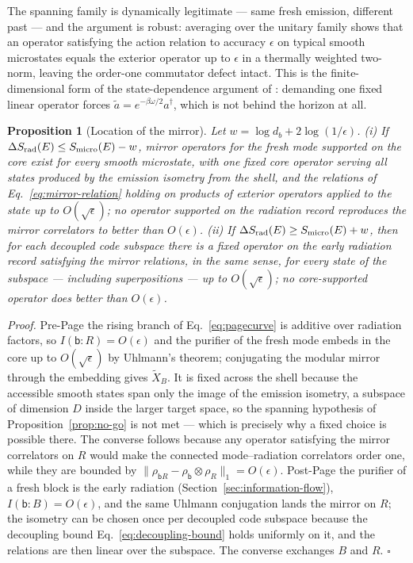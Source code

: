 \documentclass[12pt]{article}
\newcommand{\Smicro}{S_{\rm micro}}
\newtheorem{proposition}{Proposition}
\begin{document}
The spanning family is dynamically legitimate --- same fresh emission,
different past --- and the argument is robust: averaging over the unitary
family shows that an operator satisfying the action relation to accuracy
$\epsilon$ on typical smooth microstates equals the exterior operator up to
$\epsilon$ in a thermally weighted two-norm, leaving the order-one
commutator defect intact.  This is the finite-dimensional form of the
state-dependence argument of \cite{PapadodimasRaju2013,PapadodimasRaju2014}:
demanding one fixed linear operator forces $\tilde a=e^{-\beta\omega/2}
a^\dagger$, which is not behind the horizon at all.

\begin{proposition}[Location of the mirror]
\label{prop:mirror-location}
Let $w=\log d_b+2\log(1/\epsilon)$.
(i) If $\Delta S_{\rm rad}(E)\le\Smicro(E)-w$, mirror operators for the
fresh mode supported on the core exist for every smooth microstate, with
one fixed core operator serving all states produced by the emission isometry
from the shell, and the relations of Eq.~\eqref{eq:mirror-relation} holding
on products of exterior operators applied to the state up to
$O(\sqrt\epsilon)$; no operator supported on the radiation record reproduces
the mirror correlators to better than $O(\epsilon)$.
(ii) If $\Delta S_{\rm rad}(E)\ge\Smicro(E)+w$, then for each decoupled code
subspace there is a fixed operator on the early radiation record satisfying
the mirror relations, in the same sense, for every state of the subspace ---
including superpositions --- up to $O(\sqrt\epsilon)$; no core-supported
operator does better than $O(\epsilon)$.
\end{proposition}

\emph{Proof.}  Pre-Page the rising branch of Eq.~\eqref{eq:pagecurve} is
additive over radiation factors, so $I(\mathsf b:R)=O(\epsilon)$ and the
purifier of the fresh mode embeds in the core up to $O(\sqrt\epsilon)$ by
Uhlmann's theorem; conjugating the modular mirror through the embedding gives
$\widetilde X_B$.  It is fixed across the shell because the accessible smooth
states span only the image of the emission isometry, a subspace of dimension
$D$ inside the larger target space, so the spanning hypothesis of
Proposition~\ref{prop:no-go} is not met --- which is precisely why a fixed
choice is possible there.  The converse follows because any operator
satisfying the mirror correlators on $R$ would make the connected
mode--radiation correlators order one, while they are bounded by
$\|\rho_{\mathsf bR}-\rho_{\mathsf b}\otimes\rho_R\|_1=O(\epsilon)$.
Post-Page the purifier of a fresh block is the early radiation
(Section~\ref{sec:information-flow}), $I(\mathsf b:B)=O(\epsilon)$, and the
same Uhlmann conjugation lands the mirror on $R$; the isometry can be chosen
once per decoupled code subspace because the decoupling bound
Eq.~\eqref{eq:decoupling-bound} holds uniformly on it, and the relations are
then linear over the subspace.  The converse exchanges $B$ and $R$.
\hfill$\square$
\end{document}
